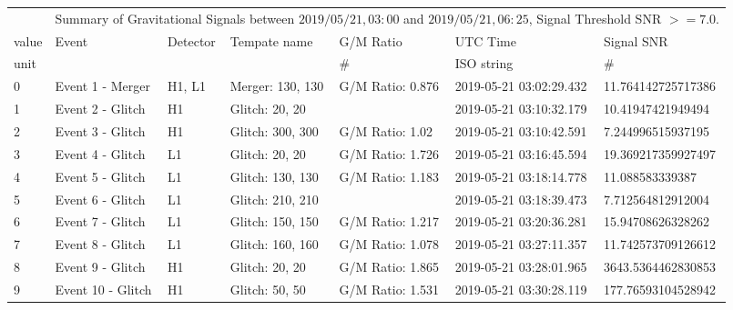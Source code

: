 \scriptsize
\setlength\LTleft{-2cm}
\label{table}
\begin{longtable}{lllllll}
\toprule
      &            \multicolumn{6}{l}{Summary of Gravitational Signals between $2019/05/21, 03:00$ and $2019/05/21, 06:25$, Signal Threshold SNR $>= 7.0$.} \\
value &                                             Event & Detector &      Tempate name &       G/M Ratio &                 UTC Time &          Signal SNR \\
unit &                                                    &          &                   &              \# &               ISO string &                  \# \\
\midrule
\endhead
0  &                                   Event 1 - Merger &   H1, L1 &  Merger: 130, 130 &  G/M Ratio: 0.876 &  2019-05-21 03:02:29.432 &   11.764142725717386 \\
1  &                                   Event 2 - Glitch &       H1 &    Glitch: 20, 20 &                   &  2019-05-21 03:10:32.179 &   10.41947421949494  \\
2  &                                   Event 3 - Glitch &       H1 &  Glitch: 300, 300 &   G/M Ratio: 1.02 &  2019-05-21 03:10:42.591 &    7.244996515937195 \\
3  &                                   Event 4 - Glitch &       L1 &    Glitch: 20, 20 &  G/M Ratio: 1.726 &  2019-05-21 03:16:45.594 &   19.369217359927497 \\
4  &                                   Event 5 - Glitch &       L1 &  Glitch: 130, 130 &  G/M Ratio: 1.183 &  2019-05-21 03:18:14.778 &   11.088583339387 \\
5  &                                   Event 6 - Glitch &       L1 &  Glitch: 210, 210 &                   &  2019-05-21 03:18:39.473 &    7.712564812912004 \\
6  &                                   Event 7 - Glitch &       L1 &  Glitch: 150, 150 &  G/M Ratio: 1.217 &  2019-05-21 03:20:36.281 &   15.94708626328262 \\
7  &                                   Event 8 - Glitch &       L1 &  Glitch: 160, 160 &  G/M Ratio: 1.078 &  2019-05-21 03:27:11.357 &   11.742573709126612 \\
8  &                                   Event 9 - Glitch &       H1 &    Glitch: 20, 20 &  G/M Ratio: 1.865 &  2019-05-21 03:28:01.965 & 3643.5364462830853 \\
9  &                                  Event 10 - Glitch &       H1 &    Glitch: 50, 50 &  G/M Ratio: 1.531 &  2019-05-21 03:30:28.119 &  177.76593104528942 \\

\end{longtable}
